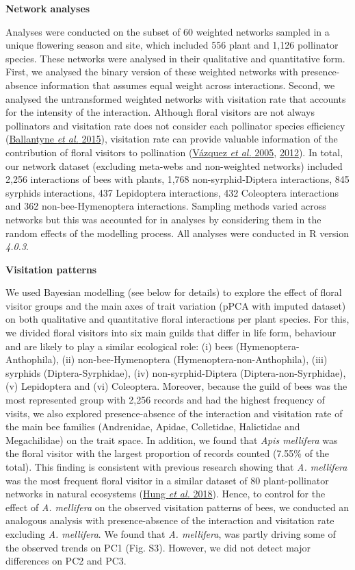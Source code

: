 \documentclass[
  12pt,
  a4paper,
]{article}
\begin{document}
\textbf{Network analyses}

Analyses were conducted on the subset of 60 weighted networks sampled in a unique flowering season and site, which included 556 plant and 1,126 pollinator species. These networks were analysed in their qualitative and quantitative form. First, we analysed the binary version of these weighted networks with presence-absence information that assumes equal weight across interactions. Second, we analysed the untransformed weighted networks with visitation rate that accounts for the intensity of the interaction. Although floral visitors are not always pollinators and visitation rate does not consider each pollinator species efficiency (\protect\hyperlink{ref-ballantyne2015}{Ballantyne \emph{et al.} 2015}), visitation rate can provide valuable information of the contribution of floral visitors to pollination (\protect\hyperlink{ref-vazquez2005}{Vázquez \emph{et al.} 2005}, \protect\hyperlink{ref-vazquez2012}{2012}). In total, our network dataset (excluding meta-webs and non-weighted networks) included 2,256 interactions of bees with plants, 1,768 non-syrphid-Diptera interactions, 845 syrphids interactions, 437 Lepidoptera interactions, 432 Coleoptera interactions and 362 non-bee-Hymenoptera interactions. Sampling methods varied across networks but this was accounted for in analyses by considering them in the random effects of the modelling process. All analyses were conducted in R version \emph{4.0.3}.

\textbf{Visitation patterns}

We used Bayesian modelling (see below for details) to explore the effect of floral visitor groups and the main axes of trait variation (pPCA with imputed dataset) on both qualitative and quantitative floral interactions per plant species. For this, we divided floral visitors into six main guilds that differ in life form, behaviour and are likely to play a similar ecological role: (i) bees (Hymenoptera-Anthophila), (ii) non-bee-Hymenoptera (Hymenoptera-non-Anthophila), (iii) syrphids (Diptera-Syrphidae), (iv) non-syrphid-Diptera (Diptera-non-Syrphidae), (v) Lepidoptera and (vi) Coleoptera. Moreover, because the guild of bees was the most represented group with 2,256 records and had the highest frequency of visits, we also explored presence-absence of the interaction and visitation rate of the main bee families (Andrenidae, Apidae, Colletidae, Halictidae and Megachilidae) on the trait space. In addition, we found that \emph{Apis mellifera} was the floral visitor with the largest proportion of records counted (7.55\% of the total). This finding is consistent with previous research showing that \emph{A. mellifera} was the most frequent floral visitor in a similar dataset of 80 plant-pollinator networks in natural ecosystems (\protect\hyperlink{ref-hung2018}{Hung \emph{et al.} 2018}). Hence, to control for the effect of \emph{A. mellifera} on the observed visitation patterns of bees, we conducted an analogous analysis with presence-absence of the interaction and visitation rate excluding \emph{A. mellifera}. We found that \emph{A. mellifera}, was partly driving some of the observed trends on PC1 (Fig. S3). However, we did not detect major differences on PC2 and PC3.
\end{document}
